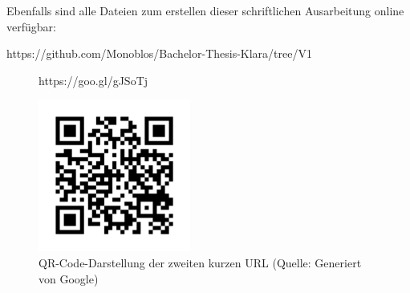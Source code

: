 Ebenfalls sind alle Dateien zum erstellen dieser schriftlichen Ausarbeitung online verfügbar:

https://github.com/Monoblos/Bachelor-Thesis-Klara/tree/V1

\begin{figure}[h]
	\centering
	https://goo.gl/gJSoTj
	
	\includegraphics[width=5cm]{fazit/thesis_short.png}
	\caption{QR-Code-Darstellung der zweiten kurzen URL (Quelle: Generiert von Google)}
\end{figure}